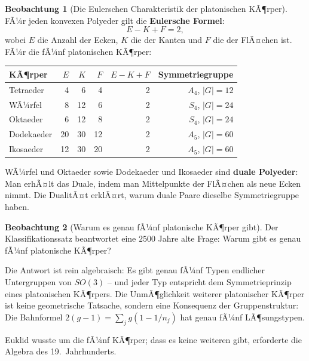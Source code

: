 ﻿\documentclass[a4paper,12pt]{report}
\theoremstyle{definition}
\newtheorem{beobachtung}{Beobachtung}
\begin{document}
\begin{beobachtung}[Die Eulerschen Charakteristik der platonischen KÃ¶rper]
    FÃ¼r jeden konvexen Polyeder gilt die \textbf{Eulersche Formel}:
    \[
        E - K + F = 2,
    \]
    wobei $E$ die Anzahl der Ecken, $K$ die der Kanten und $F$ die
    der FlÃ¤chen ist. FÃ¼r die fÃ¼nf platonischen KÃ¶rper:

    \begin{center}
    \begin{tabular}{lrrrrr}
        \hline
        KÃ¶rper & $E$ & $K$ & $F$ & $E - K + F$ & Symmetriegruppe \\
        \hline
        Tetraeder  & 4  & 6  & 4  & 2 & $A_4$, $|G|=12$ \\
        WÃ¼rfel     & 8  & 12 & 6  & 2 & $S_4$, $|G|=24$ \\
        Oktaeder   & 6  & 12 & 8  & 2 & $S_4$, $|G|=24$ \\
        Dodekaeder & 20 & 30 & 12 & 2 & $A_5$, $|G|=60$ \\
        Ikosaeder  & 12 & 30 & 20 & 2 & $A_5$, $|G|=60$ \\
        \hline
    \end{tabular}
    \end{center}

    WÃ¼rfel und Oktaeder sowie Dodekaeder und Ikosaeder sind
    \textbf{duale Polyeder}: Man erhÃ¤lt das Duale, indem man Mittelpunkte der
    FlÃ¤chen als neue Ecken nimmt. Die DualitÃ¤t erklÃ¤rt, warum duale Paare
    dieselbe Symmetriegruppe haben.
\end{beobachtung}

\begin{beobachtung}[Warum es genau fÃ¼nf platonische KÃ¶rper gibt]
    Der Klassifikationssatz beantwortet eine $2500$ Jahre alte Frage:
    Warum gibt es genau fÃ¼nf platonische KÃ¶rper?

    Die Antwort ist rein algebraisch: Es gibt genau fÃ¼nf Typen endlicher
    Untergruppen von $SO(3)$ -- und jeder Typ entspricht dem
    Symmetrieprinzip eines platonischen KÃ¶rpers. Die UnmÃ¶glichkeit
    weiterer platonischer KÃ¶rper ist keine geometrische Tatsache,
    sondern eine Konsequenz der Gruppenstruktur: Die Bahnformel
    $2(g-1) = \sum_j g(1 - 1/n_j)$ hat genau fÃ¼nf LÃ¶sungstypen.

    Euklid wusste um die fÃ¼nf KÃ¶rper; dass es keine weiteren gibt,
    erforderte die Algebra des 19.\ Jahrhunderts.
\end{beobachtung}
\end{document}
